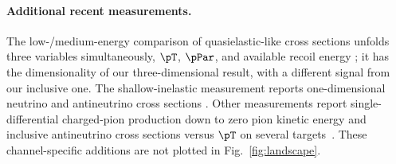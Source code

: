 \paragraph{Additional recent measurements.} The low-/medium-energy comparison of quasielastic-like cross sections unfolds three variables simultaneously, $\pT$, $\pPar$, and available recoil energy \cite{MINERvA:2026qeleme}; it has the dimensionality of our three-dimensional result, with a different signal from our inclusive one. The shallow-inelastic measurement reports one-dimensional neutrino and antineutrino cross sections \cite{MINERvA:2026sis}. Other measurements report single-differential charged-pion production down to zero pion kinetic energy \cite{MINERvA:2026pion} and inclusive antineutrino cross sections versus $\pT$ on several targets~\cite{MINERvA:2026antinu}. These channel-specific additions are not plotted in Fig.~\ref{fig:landscape}.
